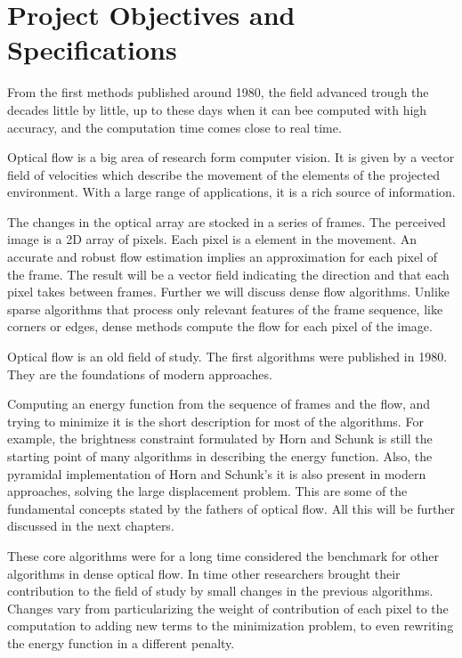 \documentclass[12pt,a4paper,twoside]{report}
\begin{document}
\chapter{Project Objectives and Specifications} \label{POS}

 From the first methods published around 1980, the field advanced trough the decades little by little, up to these days when it can bee computed with high accuracy, and the computation time comes close to real time.


Optical flow is a big area of research form computer vision. It is given by a vector field of velocities which describe the movement of the elements of the projected environment. With a large range of applications, it is a rich source of information. 


 The changes in the optical array are stocked in a series of frames. The perceived image is a 2D array of pixels. Each pixel is a element in the movement. An accurate and robust flow estimation implies an approximation for each pixel of the frame. The result will be a vector field indicating the direction and that each pixel takes between frames. Further we will discuss dense flow algorithms. Unlike sparse algorithms that process only relevant features of the frame sequence, like corners or edges, dense methods compute the flow for each pixel of the image.
 
 Optical flow is an old field of study. 
 The first algorithms were published in 1980. They are the foundations of modern approaches. 
 
 Computing an energy function from the sequence of frames and the flow, and trying to minimize it is the short description for most of the algorithms. For example, the brightness constraint formulated by Horn and Schunk is still the starting point of many algorithms in describing the energy function. Also, the pyramidal implementation of Horn and Schunk's it is also present in modern approaches, solving the large displacement problem. This are some of the fundamental concepts stated by the fathers of optical flow. All this will be further discussed in the next chapters.
 
 These core algorithms were for a long time considered the benchmark for other algorithms in dense optical flow. 
 In time other researchers brought their contribution to the field of study by small changes in the previous algorithms. Changes vary from particularizing the weight of contribution of each pixel to the computation to adding new terms to the minimization problem, to even rewriting the energy function in a different penalty. 
 
\end{document}
